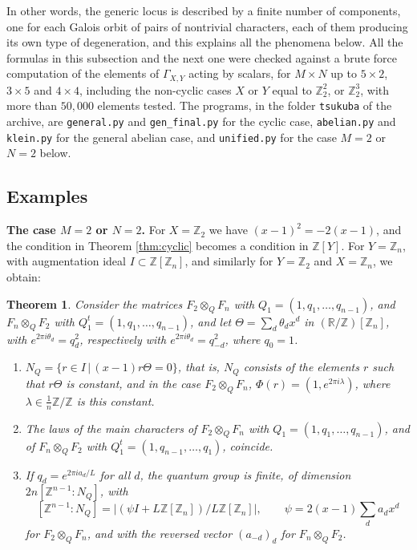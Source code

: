 \documentclass[11pt]{amsart}
\newtheorem{theorem}{Theorem}[section]
\begin{document}
\noindent In other words, the generic locus is described by a finite number of components, one for each Galois orbit of pairs of nontrivial characters, each of them producing its own type of degeneration, and this explains all the phenomena below. All the formulas in this subsection and the next one were checked against a brute force computation of the elements of $\Gamma_{X,Y}$ acting by scalars, for $M\times N$ up to $5\times2$, $3\times5$ and $4\times4$, including the non-cyclic cases $X$ or $Y$ equal to $\mathbb Z_2^2$, or $\mathbb Z_2^3$, with more than $50,000$ elements tested. The programs, in the folder \texttt{tsukuba} of the archive, are \texttt{general.py} and \texttt{gen\_final.py} for the cyclic case, \texttt{abelian.py} and \texttt{klein.py} for the general abelian case, and \texttt{unified.py} for the case $M=2$ or $N=2$ below.

\subsection{Examples}

\noindent\textbf{The case $M=2$ or $N=2$.} For $X=\mathbb Z_2$ we have $(x-1)^2=-2(x-1)$, and the condition in Theorem \ref{thm:cyclic} becomes a condition in $\mathbb Z[Y]$. For $Y=\mathbb Z_n$, with augmentation ideal $I\subset\mathbb Z[\mathbb Z_n]$, and similarly for $Y=\mathbb Z_2$ and $X=\mathbb Z_n$, we obtain:

\begin{theorem}\label{thm:2n}
Consider the matrices $F_2\otimes_QF_n$ with $Q_1=(1,q_1,\ldots,q_{n-1})$, and $F_n\otimes_QF_2$ with $Q^t_1=(1,q_1,\ldots,q_{n-1})$, and let $\Theta=\sum_d\theta_dx^d$ in $(\mathbb R/\mathbb Z)[\mathbb Z_n]$, with $e^{2\pi i\theta_d}=q_d^2$, respectively with $e^{2\pi i\theta_d}=q_{-d}^2$, where $q_0=1$.
\begin{enumerate}
\item $N_Q=\{r\in I\,|\,(x-1)r\Theta=0\}$, that is, $N_Q$ consists of the elements $r$ such that $r\Theta$ is constant, and in the case $F_2\otimes_QF_n$, $\Phi(r)=(1,e^{2\pi i\lambda})$, where $\lambda\in\frac{1}{n}\mathbb Z/\mathbb Z$ is this constant.

\item The laws of the main characters of $F_2\otimes_QF_n$ with $Q_1=(1,q_1,\ldots,q_{n-1})$, and of $F_n\otimes_QF_2$ with $Q^t_1=(1,q_{n-1},\ldots,q_1)$, coincide.

\item If $q_d=e^{2\pi ia_d/L}$ for all $d$, the quantum group is finite, of dimension $2n[\mathbb Z^{n-1}:N_Q]$, with
$$[\mathbb Z^{n-1}:N_Q]=\left|\left(\psi I+L\mathbb Z[\mathbb Z_n]\right)/L\mathbb Z[\mathbb Z_n]\right|,\qquad\psi=2(x-1)\sum_da_dx^d$$
for $F_2\otimes_QF_n$, and with the reversed vector $(a_{-d})_d$ for $F_n\otimes_QF_2$.
\end{enumerate}
\end{theorem}
\end{document}
